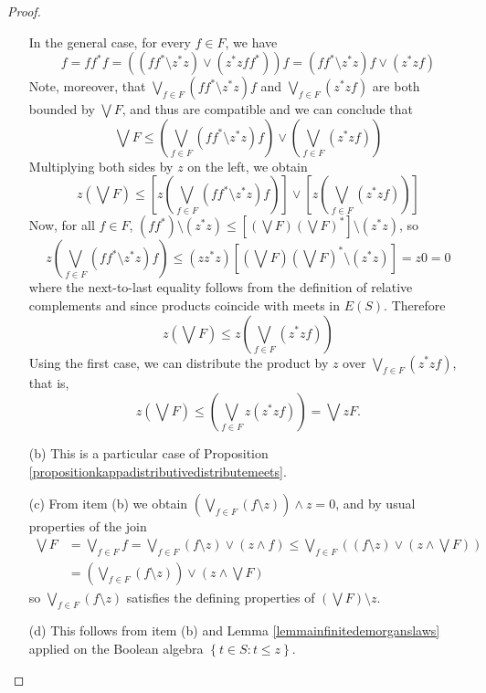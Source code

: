 \begin{proof}
\begin{enumerate}
In the general case, for every $f\in F$, we have
\[f=ff^*f=\left(\left(ff^*\setminus z^*z\right)\lor(z^*zff^*)\right)f=\left(ff^*\setminus z^*z\right)f\lor(z^*zf)\]
Note, moreover, that $\bigvee_{f\in F}(ff^*\setminus z^*z)f$ and $\bigvee_{f\in F}(z^*zf)$ are both bounded by $\bigvee F$, and thus are compatible and we can conclude that
\[\bigvee F\leq\left(\bigvee_{f\in F}\left(ff^*\setminus z^*z\right)f\right)\lor\left(\bigvee_{f\in F}(z^*zf)\right)\]
Multiplying both sides by $z$ on the left, we obtain
\[z\left(\bigvee F\right)\leq\left[z\left(\bigvee_{f\in F}\left(ff^*\setminus z^*z\right)f\right)\right]\lor\left[z\left(\bigvee_{f\in F}(z^*zf)\right)\right]\]
Now, for all $f\in F$, $(ff^*)\setminus (z^*z)\leq\left[\left(\bigvee F\right)\left(\bigvee F\right)^*\right]\setminus(z^*z)$, so
\[z\left(\bigvee_{f\in F}\left(ff^*\setminus z^*z\right)f\right)\leq (zz^*z)\left[\left(\bigvee F\right)\left(\bigvee F\right)^*\setminus(z^*z)\right]=z0=0\]
where the next-to-last equality follows from the definition of relative complements and since products coincide with meets in $E(S)$. Therefore
\[z\left(\bigvee F\right)\leq z\left(\bigvee_{f\in F}(z^*zf)\right)\]
Using the first case, we can distribute the product by $z$ over $\bigvee_{f\in F}(z^*zf)$, that is,
\[z\left(\bigvee F\right)\leq\left(\bigvee_{f\in F}z(z^*zf)\right)=\bigvee zF.\]
\item[(b)] This is a particular case of Proposition \ref{propositionkappadistributivedistributemeets}.%
\item[(c)] From item (b) we obtain $\left(\bigvee_{f\in F}(f\setminus z)\right)\land z=0$, and by usual properties of the join
\begin{align*}
\bigvee F&=\bigvee_{f\in F}f=\bigvee_{f\in F}(f\setminus z)\lor(z\land f)\leq\bigvee_{f\in F}\left((f\setminus z)\lor (z\land\bigvee F)\right)\\
&=\left(\bigvee_{f\in F}(f\setminus z)\right)\lor\left(z\land\bigvee F\right)
\end{align*}
so $\bigvee_{f\in F}(f\setminus z)$ satisfies the defining properties of $\left(\bigvee F\right)\setminus z$.
\item[(d)] This follows from item (b) and Lemma \ref{lemmainfinitedemorganslaws} applied on the Boolean algebra $\left\{t\in S:t\leq z\right\}$.\qedhere
\end{enumerate}
\end{proof}

